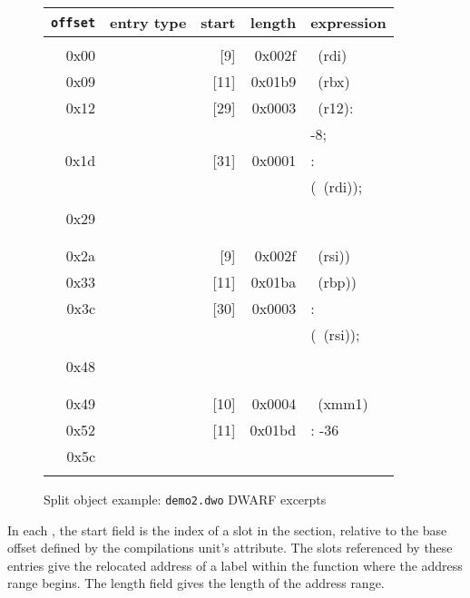\begin{figure}
\begin{dwflisting}
\begin{tabular}{rlrrl}
\texttt{offset} & entry type & start & length & expression \\
\hline \\
0x00 & \DWLLEstartlengthentry &  [9] & 0x002f & \DWOPregfive~(rdi) \\
0x09 & \DWLLEstartlengthentry & [11] & 0x01b9 & \DWOPregthree~(rbx) \\
0x12 & \DWLLEstartlengthentry & [29] & 0x0003 & \DWOPbregtwelve~(r12):\\
&&&& -8; \DWOPstackvalue \\
0x1d & \DWLLEstartlengthentry & [31] & 0x0001 & \DWOPentryvalue: \\
&&&& (\DWOPregfive~(rdi)); \\
&&&& \DWOPstackvalue \\
0x29 & \DWLLEendoflistentry &&& \\
\\   & \hhline{-} &&& \\
0x2a & \DWLLEstartlengthentry &  [9] & 0x002f & \DWOPregfour~(rsi)) \\
0x33 & \DWLLEstartlengthentry & [11] & 0x01ba & \DWOPregsix~(rbp)) \\
0x3c & \DWLLEstartlengthentry & [30] & 0x0003 & \DWOPentryvalue: \\
&&&& (\DWOPregfour~(rsi)); \\
&&&& \DWOPstackvalue \\
0x48 & \DWLLEendoflistentry &&& \\
\\   & \hhline{-} &&& \\
0x49 & \DWLLEstartlengthentry & [10] & 0x0004 & \DWOPregeighteen~(xmm1) \\
0x52 & \DWLLEstartlengthentry & [11] & 0x01bd & \DWOPfbreg: -36 \\
0x5c & \DWLLEendoflistentry &&& \\
&&&& \\
\end{tabular}
\end{dwflisting}
\caption{Split object example: \texttt{demo2.dwo} DWARF \dotdebuglocdwo{} excerpts}
\label{fig:splitobjectexampledemotwodwodwarfdebuglocdwoexcerpts}
\end{figure}

In each \DWLLEstartlengthentry{}, the start field is the index
of a slot in the \dotdebugaddr{} section, relative to the base
offset defined by the compilations unit's \DWATaddrbase{}
attribute. The \dotdebugaddr{} slots referenced by these entries give
the relocated address of a label within the function where the
address range begins. The length field gives the length of the
address range.


